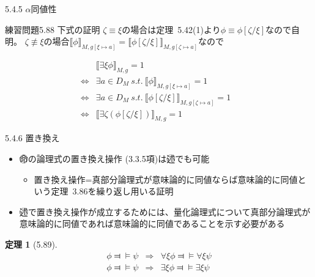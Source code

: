 \documentclass[dvipdfmx,11pt]{beamer}
\newcommand{\predl}{\textcircled{\scriptsize 述}}
\newcommand{\propl}{\textcircled{\scriptsize 命}}
\newtheorem{theo}[theorem]{定理}
\begin{document}
\begin{frame}{5.4.5 \(\alpha\)同値性}
  \begin{block}{練習問題5.88 下式の証明}
    \(\zeta\equiv\xi\)の場合は定理~5.42(1)より\(\phi\equiv\phi[\zeta/\xi]\)なので自明。
    \(\zeta\nequiv\xi\)の場合\(\llbracket\phi\rrbracket_{M,g[\xi\mapsto a]}=\llbracket\phi[\zeta/\xi]\rrbracket_{M,g[\zeta\mapsto a]}\)なので

    \[
    \begin{array}{rll}
      & \llbracket \exists \xi \phi \rrbracket_{M,g} = 1 & \\
      \iff & \exists a \in D_{M} \ s.t. \ \llbracket\phi\rrbracket_{M,g[\xi\mapsto a]} = 1 & \\
      \iff & \exists a \in D_{M} \ s.t. \ \llbracket\phi[\zeta/\xi]\rrbracket_{M,g[\zeta\mapsto a]} = 1 & \\
      \iff & \llbracket\exists\zeta(\phi[\zeta/\xi])\rrbracket_{M,g} = 1 &
    \end{array}
    \]
  \end{block}
\end{frame}

\begin{frame}{5.4.6 置き換え}
  \begin{itemize}
  \item \propl{}の論理式の置き換え操作 (3.3.5項)は\predl{}でも可能
    \begin{itemize}
    \item 置き換え操作=真部分論理式が意味論的に同値ならば意味論的に同値という定理~3.86を繰り返し用いる証明
    \end{itemize}
  \item \predl{}で置き換え操作が成立するためには、量化論理式について真部分論理式が意味論的に同値であれば意味論的に同値であることを示す必要がある
  \end{itemize}

  \begin{theo}[5.89]
    \begin{eqnarray*}
      \phi \Dashv \vDash \psi & \Rightarrow & \forall \xi \phi \Dashv \vDash \forall \xi \psi \\
      \phi \Dashv \vDash \psi & \Rightarrow & \exists \xi \phi \Dashv \vDash \exists \xi \psi \\
    \end{eqnarray*}
  \end{theo}

\end{frame}
\end{document}
